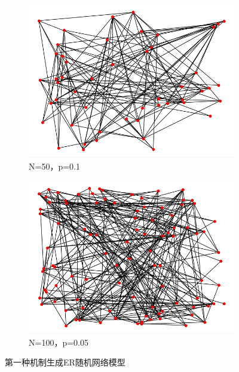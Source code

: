 \documentclass[bachelor,adobefonts]{jnuthesis}
\begin{document}
\begin{figure}[h!]
  \centering 
  \begin{subfigure}[b]{0.49\linewidth}
    \centering
    \includegraphics[width=\linewidth]{WER-1.png}
    \caption{N=50，p=0.1}
  \end{subfigure}
  \begin{subfigure}[b]{0.49\linewidth}
    \centering
    \includegraphics[width=\linewidth]{WER-2.png}
    \caption{N=100，p=0.05}
  \end{subfigure}
  \caption{第一种机制生成ER随机网络模型}
\end{figure}

\end{document}
